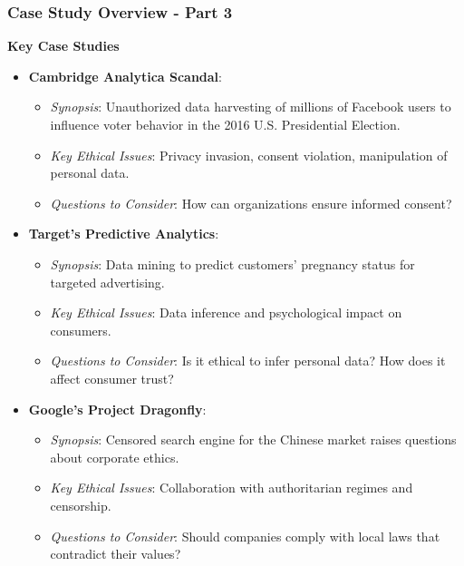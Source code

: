 \documentclass[aspectratio=169]{beamer}
\begin{document}
\begin{frame}[fragile]
    \frametitle{Case Study Overview - Part 3}
    \textbf{Key Case Studies}
    
    \begin{itemize}
        \item \textbf{Cambridge Analytica Scandal}:
            \begin{itemize}
                \item \textit{Synopsis}: Unauthorized data harvesting of millions of Facebook users to influence voter behavior in the 2016 U.S. Presidential Election.
                \item \textit{Key Ethical Issues}: Privacy invasion, consent violation, manipulation of personal data.
                \item \textit{Questions to Consider}: How can organizations ensure informed consent?
            \end{itemize}

        \item \textbf{Target's Predictive Analytics}:
            \begin{itemize}
                \item \textit{Synopsis}: Data mining to predict customers' pregnancy status for targeted advertising.
                \item \textit{Key Ethical Issues}: Data inference and psychological impact on consumers.
                \item \textit{Questions to Consider}: Is it ethical to infer personal data? How does it affect consumer trust?
            \end{itemize}

        \item \textbf{Google's Project Dragonfly}:
            \begin{itemize}
                \item \textit{Synopsis}: Censored search engine for the Chinese market raises questions about corporate ethics.
                \item \textit{Key Ethical Issues}: Collaboration with authoritarian regimes and censorship.
                \item \textit{Questions to Consider}: Should companies comply with local laws that contradict their values?
            \end{itemize}
    \end{itemize}
\end{frame}
\end{document}
